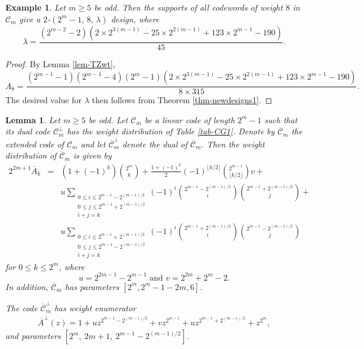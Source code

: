 \documentclass[1p,final]{elsarticle}
\newtheorem{lemma}[theorem]{Lemma}
\newtheorem{example}{Example}
\newcommand{\C}{{\mathcal{C}}}
\begin{document}
\begin{example} 
Let $m \geq 5$ be odd. 
Then the supports of all codewords of weight $8$ in $\C_m$ give a $2$-$(2^m-1,\, 8,\, \lambda)$ design, where 
$$ 
\lambda= \frac{ (2^{m-2}-2)  (2 \times 2^{3(m-1)} - 25 \times 2^{2(m-1)} + 123 \times 2^{m-1} - 190)}{45}. 
$$
\end{example} 

\begin{proof}
By Lemma  \ref{lem-TZwt}, 
$$ 
A_8 =  \frac{(2^{m-1}-1) (2^{m-1}-4)  (2^m-1) (2 \times 2^{3(m-1)} - 25 \times 2^{2(m-1)} + 123 \times 2^{m-1} - 190)}{8 \times 315}. 
$$
The desired value for $\lambda$ then follows from Theorem \ref{thm-newdesigns1}. 
\end{proof}







\begin{lemma}\label{lem-TZEwt} 
Let $m \geq 5$ be odd. Let $\C_m$ be a linear code of length $2^m-1$ such that its dual code
$\C_m^\perp$ has the weight distribution of Table \ref{tab-CG1}. Denote by $\overline{\C}_m$ 
the extended code of $\C_m$ and let $\overline{\C}_m^\perp$ denote the dual of $\overline{\C}_m$.
Then the weight distribution
of $\overline{\C}_m$ is given by 
\begin{eqnarray*}
2^{2m+1}\overline{A}_k&=&  (1+(-1)^k) \binom{2^m}{k} + 
\frac{1+(-1)^k}{2} (-1)^{\lfloor k/2 \rfloor} \binom{2^{m-1}}{\lfloor k/2 \rfloor} v  + \\ 
& & u \sum_{\substack{0 \le i \le 2^{m-1}-2^{(m-1)/2} \\
0\le j \le 2^{m-1}+2^{(m-1)/2} \\i+j=k}}(-1)^i \binom{2^{m-1}-2^{(m-1)/2}} {i} \binom{2^{m-1}+2^{(m-1)/2}}{j} + \\
& & u  
\sum_{\substack{0 \le i \le 2^{m-1}+2^{(m-1)/2} \\
0\le j \le 2^{m-1}-2^{(m-1)/2} \\i+j=k}}(-1)^i \binom{2^{m-1}+2^{(m-1)/2}}{i}\binom{2^{m-1}-2^{(m-1)/2}}{j} 
\end{eqnarray*}
for $0 \le k \le 2^m$, where 
$$ 
u=2^{2m-1}-2^{m-1} \mbox{ and } v = 2^{2m}+2^m-2. 
$$
In addition, $\overline{\C}_m$ has parameters $[2^m, 2^m-1-2m, 6]$. 

The code $\overline{\C}_m^\perp$ has weight enumerator 
\begin{eqnarray}\label{eqn-wtenumerator}
\overline{A}^\perp(z) = 1+uz^{2^{m-1}-2^{(m-1)/2}}+vz^{2^{m-1}}+uz^{2^{m-1}+2^{(m-1)/2}}+z^{2^m}, 
\end{eqnarray} 
and parameters $[2^m, \ 2m+1, \ 2^{m-1}-2^{(m-1)/2}]$. 

\end{lemma}
\end{document}
